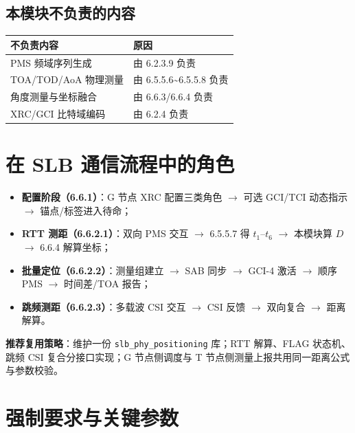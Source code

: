 \documentclass[11pt,a4paper]{ctexart}
\begin{document}
\subsection{本模块不负责的内容}

\begin{table}[h]
\centering
\small
\begin{tabular}{p{5.5cm}p{8.5cm}}
\toprule
\textbf{不负责内容} & \textbf{原因} \\
\midrule
PMS 频域序列生成 & 由 6.2.3.9 负责 \\
TOA/TOD/AoA 物理测量 & 由 6.5.5.6\textasciitilde 6.5.5.8 负责 \\
角度测量与坐标融合 & 由 6.6.3/6.6.4 负责 \\
XRC/GCI 比特域编码 & 由 6.2.4 负责 \\
\bottomrule
\end{tabular}
\end{table}

\section{在 SLB 通信流程中的角色}

\begin{itemize}
  \item \textbf{配置阶段（6.6.1）}：G 节点 XRC 配置三类角色 $\rightarrow$ 可选 GCI/TCI 动态指示 $\rightarrow$ 锚点/标签进入待命；
  \item \textbf{RTT 测距（6.6.2.1）}：双向 PMS 交互 $\rightarrow$ 6.5.5.7 得 $t_1$--$t_6$ $\rightarrow$ 本模块算 $D$ $\rightarrow$ 6.6.4 解算坐标；
  \item \textbf{批量定位（6.6.2.2）}：测量组建立 $\rightarrow$ SAB 同步 $\rightarrow$ GCI-4 激活 $\rightarrow$ 顺序 PMS $\rightarrow$ 时间差/TOA 报告；
  \item \textbf{跳频测距（6.6.2.3）}：多载波 CSI 交互 $\rightarrow$ CSI 反馈 $\rightarrow$ 双向复合 $\rightarrow$ 距离解算。
\end{itemize}

\textbf{推荐复用策略}：维护一份 \texttt{slb\_phy\_positioning} 库；RTT 解算、FLAG 状态机、跳频 CSI 复合分接口实现；G 节点侧调度与 T 节点侧测量上报共用同一距离公式与参数校验。

\section{强制要求与关键参数}
\end{document}
